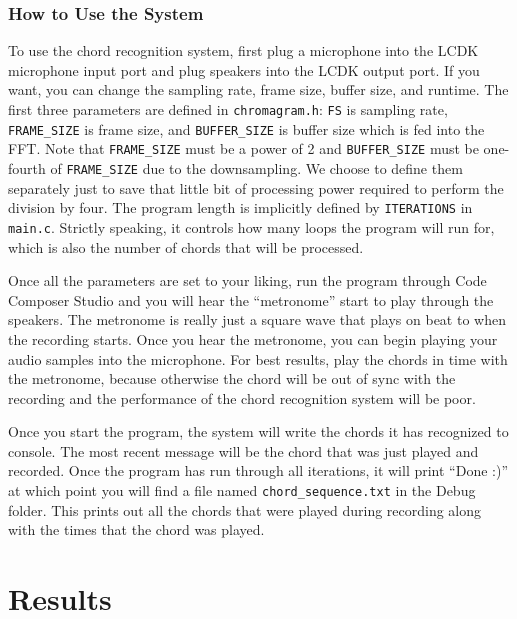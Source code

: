 \documentclass[journal]{IEEEtran}
\begin{document}
\subsubsection{How to Use the System}
To use the chord recognition system, first plug a microphone into the LCDK microphone input port and plug speakers into the LCDK output port.
If you want, you can change the sampling rate, frame size, buffer size, and runtime.
The first three parameters are defined in \texttt{chromagram.h}: \texttt{FS} is sampling rate, \texttt{FRAME\_SIZE} is frame size, and \texttt{BUFFER\_SIZE} is buffer size which is fed into the FFT.
Note that \texttt{FRAME\_SIZE} must be a power of 2 and \texttt{BUFFER\_SIZE} must be one-fourth of \texttt{FRAME\_SIZE} due to the downsampling.
We choose to define them separately just to save that little bit of processing power required to perform the division by four.
The program length is implicitly defined by \texttt{ITERATIONS} in \texttt{main.c}.
Strictly speaking, it controls how many loops the program will run for, which is also the number of chords that will be processed.

Once all the parameters are set to your liking, run the program through Code Composer Studio and you will hear the “metronome” start to play through the speakers.
The metronome is really just a square wave that plays on beat to when the recording starts.
Once you hear the metronome, you can begin playing your audio samples into the microphone.
For best results, play the chords in time with the metronome, because otherwise the chord will be out of sync with the recording and the performance of the chord recognition system will be poor.

Once you start the program, the system will write the chords it has recognized to console.
The most recent message will be the chord that was just played and recorded.
Once the program has run through all iterations, it will print ``Done :)'' at which point you will find a file named \texttt{chord\_sequence.txt} in the Debug folder.
This prints out all the chords that were played during recording along with the times that the chord was played.


\section{Results}
\end{document}
